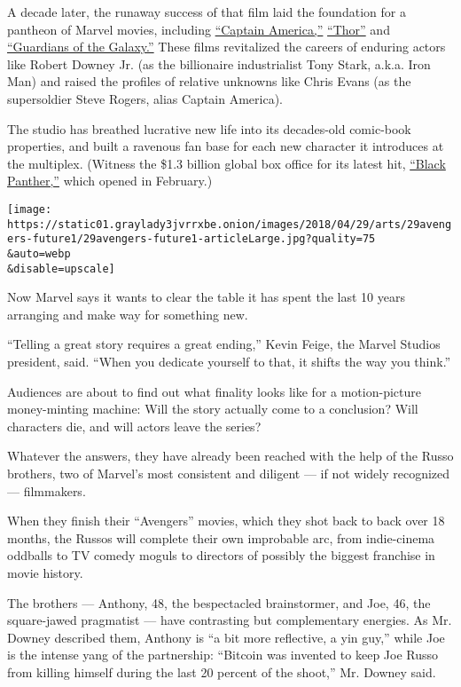 A decade later, the runaway success of that film laid the foundation for
a pantheon of Marvel movies, including
\href{https://www.youtube.com/watch?v=VuHq1bln_08}{``Captain America,''}
\href{https://www.youtube.com/watch?v=HCjPBpdlccM}{``Thor''} and
\href{https://www.youtube.com/watch?v=TW19M3VCeWc}{``Guardians of the
Galaxy.''} These films revitalized the careers of enduring actors like
Robert Downey Jr. (as the billionaire industrialist Tony Stark, a.k.a.
Iron Man) and raised the profiles of relative unknowns like Chris Evans
(as the supersoldier Steve Rogers, alias Captain America).

The studio has breathed lucrative new life into its decades-old
comic-book properties, and built a ravenous fan base for each new
character it introduces at the multiplex. (Witness the \$1.3 billion
global box office for its latest hit,
\href{https://www.nytimes3xbfgragh.onion/2018/02/12/magazine/why-black-panther-is-a-defining-moment-for-black-america.html}{``Black
Panther,''} which opened in February.)

\texttt{[image: https://static01.graylady3jvrrxbe.onion/images/2018/04/29/arts/29avengers-future1/29avengers-future1-articleLarge.jpg?quality=75\\\&auto=webp\\\&disable=upscale]}

Now Marvel says it wants to clear the table it has spent the last 10
years arranging and make way for something new.

``Telling a great story requires a great ending,'' Kevin Feige, the
Marvel Studios president, said. ``When you dedicate yourself to that, it
shifts the way you think.''

Audiences are about to find out what finality looks like for a
motion-picture money-minting machine: Will the story actually come to a
conclusion? Will characters die, and will actors leave the series?

Whatever the answers, they have already been reached with the help of
the Russo brothers, two of Marvel's most consistent and diligent --- if
not widely recognized --- filmmakers.

When they finish their ``Avengers'' movies, which they shot back to back
over 18 months, the Russos will complete their own improbable arc, from
indie-cinema oddballs to TV comedy moguls to directors of possibly the
biggest franchise in movie history.

The brothers --- Anthony, 48, the bespectacled brainstormer, and Joe,
46, the square-jawed pragmatist --- have contrasting but complementary
energies. As Mr. Downey described them, Anthony is ``a bit more
reflective, a yin guy,'' while Joe is the intense yang of the
partnership: ``Bitcoin was invented to keep Joe Russo from killing
himself during the last 20 percent of the shoot,'' Mr. Downey said.

